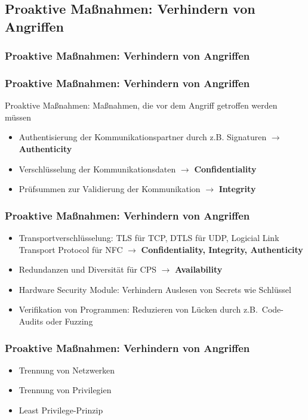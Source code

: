 \documentclass{sikslides}
\begin{document}
    \subsection{Proaktive Maßnahmen: Verhindern von Angriffen}
    \begin{frame}[t]
        \frametitle{Proaktive Maßnahmen: Verhindern von Angriffen}
        \frametitle{Proaktive Maßnahmen: Verhindern von Angriffen}
        \begin{overlayarea}{\linewidth}{1cm}
            \begin{block}{}
                Proaktive Maßnahmen: Maßnahmen, die vor dem Angriff getroffen werden müssen
            \end{block}
        \end{overlayarea}

        \vspace{2cm}
        \begin{itemize}[<+->]
            \item Authentisierung der Kommunikationspartner durch z.B. Signaturen $\rightarrow$ \textbf{Authenticity}
            \item Verschlüsselung der Kommunikationsdaten $\rightarrow$ \textbf{Confidentiality}
            \item Prüfsummen zur Validierung der Kommunikation $\rightarrow$ \textbf{Integrity}
        \end{itemize}
    \end{frame}
    \begin{frame}
        \frametitle{Proaktive Maßnahmen: Verhindern von Angriffen}
        \begin{itemize}[<+->]
            \item Transportverschlüsselung: TLS für TCP, DTLS für UDP, Logicial Link Transport Protocol für NFC $\rightarrow$ \textbf{Confidentiality, Integrity, Authenticity}
            \item Redundanzen und Diversität für CPS $\rightarrow$ \textbf{Availability}
            \item Hardware Security Module: Verhindern Auslesen von Secrets wie Schlüssel
            \item Verifikation von Programmen: Reduzieren von Lücken durch z.B.\ Code-Audits oder Fuzzing
        \end{itemize}
    \end{frame}
    \begin{frame}
        \frametitle{Proaktive Maßnahmen: Verhindern von Angriffen}
        \begin{itemize}
            \item Trennung von Netzwerken
            \item Trennung von Privilegien
            \item Least Privilege-Prinzip
        \end{itemize}
    \end{frame}
\end{document}
